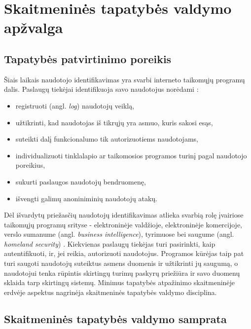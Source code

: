 \section{Skaitmeninės tapatybės valdymo apžvalga}

\subsection{Tapatybės patvirtinimo poreikis}

Šiais laikais naudotojo identifikavimas yra svarbi interneto taikomųjų
programų dalis. Paslaugų tiekėjai identifikuoja savo naudotojus norėdami \cite{RalucaBudiu2014}:

\begin{itemize}
    \item registruoti (angl. \textit{log}) naudotojų veiklą,
    \item užtikrinti, kad naudotojas iš tikrųjų yra asmuo, kuris sakosi esąs,
    \item suteikti dalį funkcionalumo tik autorizuotiems naudotojams,
    \item individualizuoti tinklalapio ar taikomosios programos turinį pagal naudotojo poreikius,
    \item sukurti paslaugos naudotojų bendruomenę,
    \item išvengti galimų anoniniminių naudotojų atakų.
\end{itemize}

Dėl išvardytų priežasčių naudotojų identifikavimas atlieka svarbią rolę įvairiose taikomųjų programų
srityse - elektroninėje valdžioje, elektroninėje komercijoje, verslo sumanume
(angl. \textit{business intelligence}), tyrimuose bei saugume
(angl. \textit{homeland security}) \cite{Glasser2009}. Kiekvienas paslaugų tiekėjas turi pasirinkti,
kaip autentifikuoti, ir, jei reikia, autorizuoti naudotojus. Programos kūrėjas taip pat turi saugoti
naudotojų suteiktus asmens duomenis ir užtikrinti jų saugumą, o naudotojui tenka rūpintis skirtingų turimų
paskyrų priežiūra ir savo duomenų sklaida tarp skirtingų sistemų. Minimus tapatybės atpažinimo
skaitmeninėje erdvėje aspektus nagrinėja skaitmeninės tapatybės valdymo disciplina.

\subsection{Skaitmeninės tapatybės valdymo samprata}
